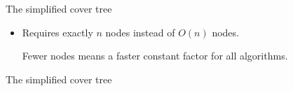 \begin{frame}[fragile]{The simplified cover tree}
{\begin{itemize}
The original cover tree was described in terms of an infinitely large tree, only a subset of which actually gets implemented.

\vspace{0.05in}
\item Requires exactly $n$ nodes instead of $O(n)$ nodes.

Fewer nodes means a faster constant factor for all algorithms. %
\end{itemize}
\vspace{1.3in}
}

\end{frame}


\begin{frame}[fragile]{The simplified cover tree}

\centering
\graphicspath{{slides/paperimg/}}


\end{frame}
